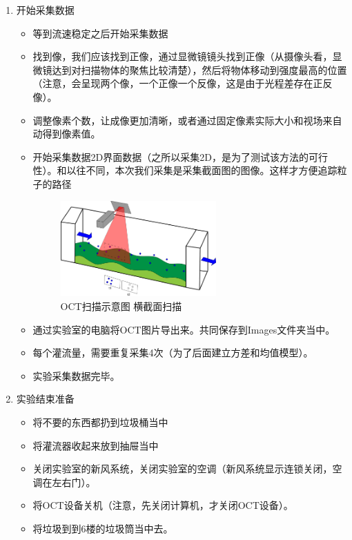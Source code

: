 \documentclass[12pt]{article}
\begin{document}
\begin{enumerate}
    \item 开始采集数据
    \begin{itemize}
        \item 等到流速稳定之后开始采集数据
        \item 找到像，我们应该找到正像，通过显微镜镜头找到正像（从摄像头看，显微镜达到对扫描物体的聚焦比较清楚），然后将物体移动到强度最高的位置（注意，会呈现两个像，一个正像一个反像，这是由于光程差存在正反像）。
        \item 调整像素个数，让成像更加清晰，或者通过固定像素实际大小和视场来自动得到像素值。
        
        \item 开始采集数据2D界面数据（之所以采集2D，是为了测试该方法的可行性）。和以往不同，本次我们采集是采集截面图的图像。这样才方便追踪粒子的路径
        \begin{figure}[H]
            \centering
            \includegraphics[width=0.6\textwidth]{Images/OCT扫描示意图.png}
            \caption{OCT扫描示意图 横截面扫描}

        \end{figure}
        \item 通过实验室的电脑将OCT图片导出来。共同保存到Images文件夹当中。
        \item 每个灌流量，需要重复采集4次（为了后面建立方差和均值模型）。
        \item 实验采集数据完毕。
    \end{itemize}

    \item 实验结束准备
    \begin{itemize}
        \item 将不要的东西都扔到垃圾桶当中
        \item 将灌流器收起来放到抽屉当中
        \item 关闭实验室的新风系统，关闭实验室的空调（新风系统显示连锁关闭，空调在左右门）。
        \item 将OCT设备关机（注意，先关闭计算机，才关闭OCT设备）。
        \item 将垃圾到到6楼的垃圾筒当中去。
    \end{itemize}
\end{enumerate}
\end{document}
